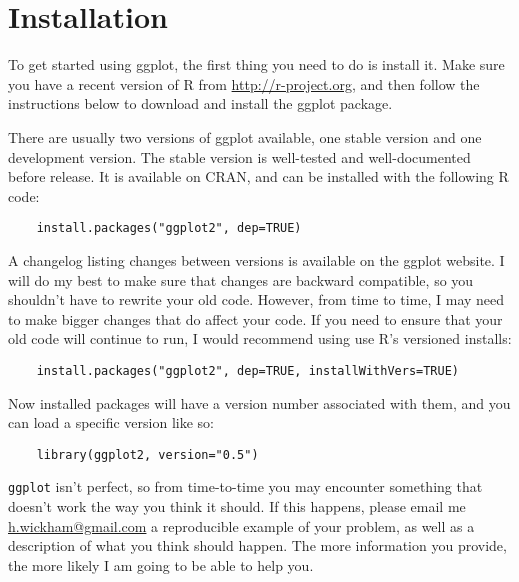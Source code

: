 \section{Installation}\label{sub:installation}

To get started using ggplot, the first thing you need to do is install it.  Make sure you have a recent version of R from \url{http://r-project.org}, and then follow the instructions below to download and install the ggplot package.  

There are usually two versions of ggplot available, one stable version and one development version. The stable version is well-tested and well-documented before release.  It is available on CRAN, and can be installed with the following R code:

\begin{verbatim}
	install.packages("ggplot2", dep=TRUE)
\end{verbatim}

% 

A changelog listing changes between versions is available on the ggplot website.  I will do my best to make sure that changes are backward compatible, so you shouldn't have to rewrite your old code.  However, from time to time, I may need to make bigger changes that do affect your code.  If you need to ensure that your old code will continue to run, I would recommend using use R's versioned installs:

\begin{verbatim}
	install.packages("ggplot2", dep=TRUE, installWithVers=TRUE)
\end{verbatim}

Now installed packages will have a version number associated with them, and you can load a specific version like so:

\begin{verbatim}
	library(ggplot2, version="0.5")
\end{verbatim}

{\tt ggplot} isn't perfect, so from time-to-time you may encounter something that doesn't work the way you think it should.  If this happens, please email me \href{mailto:h.wickham@gmail.com}{h.wickham@gmail.com} a reproducible example of your problem, as well as a description of what you think should happen.  The more information you provide, the more likely I am going to be able to help you.

